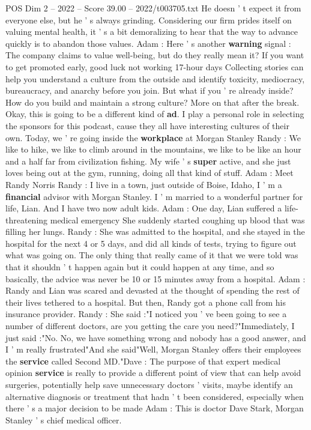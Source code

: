 \begin{textsample}{POS Dim 2 – 2022 – Score 39.00 – 2022/t003705.txt}
He doesn ' t expect it from everyone else, but he ' s always grinding.
Considering our firm prides itself on valuing mental health, it ' s a bit demoralizing to hear that the way to advance quickly is to abandon those values.
Adam : Here ' s another \textbf{warning} signal : The company claims to value well-being, but do they really mean it?
If you want to get promoted early, good luck not working 17-hour days Collecting stories can help you understand a culture from the outside and identify toxicity, mediocracy, bureaucracy, and anarchy before you join.
But what if you ' re already inside?
How do you build and maintain a strong culture?
More on that after the break.
Okay, this is going to be a different kind of \textbf{ad}.
I play a personal role in selecting the sponsors for this podcast, cause they all have interesting cultures of their own.
Today, we ' re going inside the \textbf{workplace} at Morgan Stanley Randy : We like to hike, we like to climb around in the mountains, we like to be like an hour and a half far from civilization fishing.
My wife ' s \textbf{super} active, and she just loves being out at the gym, running, doing all that kind of stuff.
Adam : Meet Randy Norris Randy : I live in a town, just outside of Boise, Idaho, I ' m a \textbf{financial} advisor with Morgan Stanley.
I ' m married to a wonderful partner for life, Lian.
And I have two now adult kids.
Adam : One day, Lian suffered a life-threatening medical emergency She suddenly started coughing up blood that was filling her lungs.
Randy : She was admitted to the hospital, and she stayed in the hospital for the next 4 or 5 days, and did all kinds of tests, trying to figure out what was going on.
The only thing that really came of it that we were told was that it shouldn ' t happen again but it could happen at any time, and so basically, the advice was never be 10 or 15 minutes away from a hospital.
Adam : Randy and Lian was scared and devasted at the thought of spending the rest of their lives tethered to a hospital.
But then, Randy got a phone call from his insurance provider.
Randy : She said :"I noticed you ' ve been going to see a number of different doctors, are you getting the care you need?"Immediately, I just said :"No.
No, we have something wrong and nobody has a good answer, and I ' m really frustrated"And she said"Well, Morgan Stanley offers their employees the \textbf{service} called Second MD."Dave : The purpose of that expert medical opinion \textbf{service} is really to provide a different point of view that can help avoid surgeries, potentially help save unnecessary doctors ' visits, maybe identify an alternative diagnosis or treatment that hadn ' t been considered, especially when there ' s a major decision to be made Adam : This is doctor Dave Stark, Morgan Stanley ' s chief medical officer.

\end{textsample}
